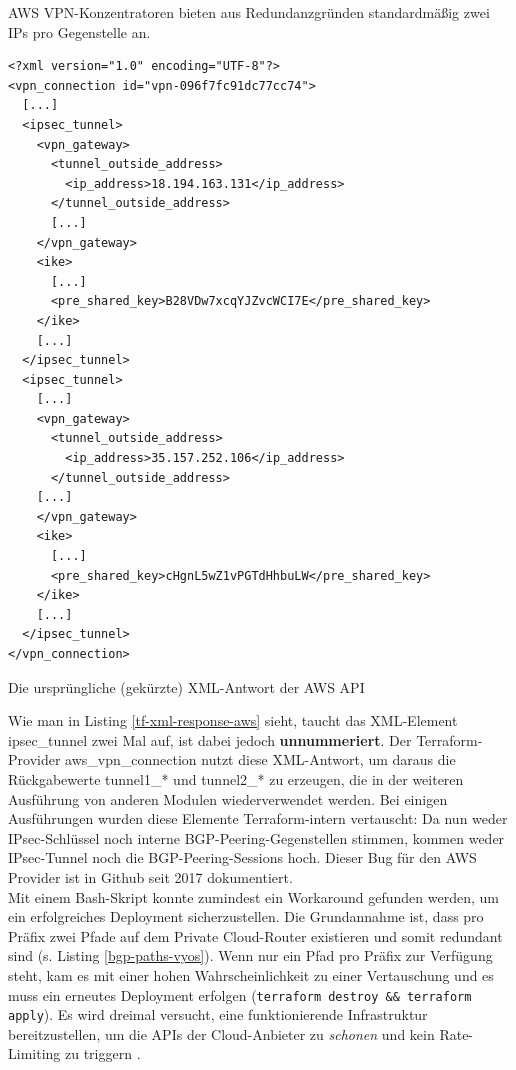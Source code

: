 AWS \gls{VPN-Konzentrator}en bieten aus Redundanzgründen standardmäßig zwei IPs pro Gegenstelle an. 
\begin{listing}[h]
\begin{verbatim}
<?xml version="1.0" encoding="UTF-8"?>
<vpn_connection id="vpn-096f7fc91dc77cc74">
  [...]
  <ipsec_tunnel>
    <vpn_gateway>
      <tunnel_outside_address>
        <ip_address>18.194.163.131</ip_address>
      </tunnel_outside_address>
      [...]
    </vpn_gateway>
    <ike>
      [...]
      <pre_shared_key>B28VDw7xcqYJZvcWCI7E</pre_shared_key>
    </ike>
    [...]
  </ipsec_tunnel>
  <ipsec_tunnel>
    [...]
    <vpn_gateway>
      <tunnel_outside_address>
        <ip_address>35.157.252.106</ip_address>
      </tunnel_outside_address>
    [...]
    </vpn_gateway>
    <ike>
      [...]
      <pre_shared_key>cHgnL5wZ1vPGTdHhbuLW</pre_shared_key>
    </ike>
    [...]
  </ipsec_tunnel>
</vpn_connection>

\end{verbatim}
\caption{Die ursprüngliche (gekürzte) XML-Antwort der AWS API}
\label{tf-xml-response-aws}
\end{listing}\FloatBarrier
Wie man in Listing \ref{tf-xml-response-aws} sieht, taucht das XML-Element ipsec\_tunnel zwei Mal auf, ist dabei jedoch \textbf{unnummeriert}.
Der Terraform-Provider aws\_vpn\_connection nutzt diese XML-Antwort, um daraus die Rückgabewerte tunnel1\_* und tunnel2\_* zu erzeugen\cite{awsattributestf2021}, die in der weiteren Ausführung von anderen Modulen wiederverwendet werden. Bei einigen Ausführungen wurden diese Elemente Terraform-intern vertauscht: Da nun weder \gls{IPsec}-Schlüssel noch interne \gls{BGP}-Peering-Gegenstellen stimmen, kommen weder \gls{IPsec}-Tunnel noch die \gls{BGP}-Peering-Sessions hoch. Dieser Bug für den AWS Provider ist in Github seit 2017 dokumentiert\cite{githubbugtf2021}.\\
Mit einem Bash-Skript konnte zumindest ein Workaround gefunden werden, um ein erfolgreiches \gls{Deployment} sicherzustellen. Die Grundannahme ist, dass pro Präfix zwei Pfade auf dem Private Cloud-Router existieren und somit redundant sind (s. Listing \ref{bgp-paths-vyos}). Wenn nur ein Pfad pro Präfix zur Verfügung steht, kam es mit einer hohen Wahrscheinlichkeit zu einer Vertauschung und es muss ein erneutes \gls{Deployment} erfolgen (\texttt{terraform destroy \&\& terraform apply}). Es wird dreimal versucht, eine funktionierende Infrastruktur bereitzustellen, um die APIs der Cloud-Anbieter zu \textit{schonen} und kein Rate-Limiting zu triggern \cite{awsthrottling2021}.
